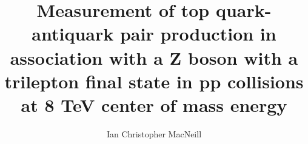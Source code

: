\title{Measurement of top quark-antiquark pair production in association with a Z boson with a trilepton final state in pp collisions at 8 TeV center of mass energy}

\author{Ian Christopher MacNeill}





